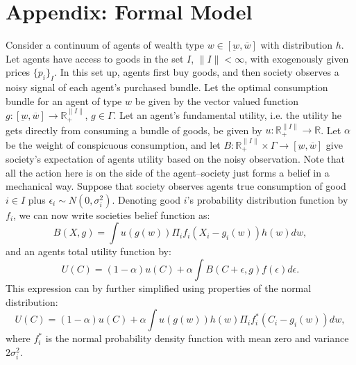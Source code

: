 \documentclass[a4paper,10pt]{article}
\begin{document}
\section*{Appendix: Formal Model}
Consider a continuum of agents of wealth type $w\in[\underbar{w},\overline{w}]$ with distribution $h$.  Let agents have access to goods in the set $I$, $\|I\|<\infty$, with exogenously given prices $\{p_i\}_I$.  In this set up, agents first buy goods, and then society observes a noisy signal of each agent's purchased bundle.  Let the optimal consumption bundle for an agent of type $w$ be given by the vector valued function $g:[\underbar{w},\overline{w}]\rightarrow \mathbb{R}_+^{\|I\|}$, $g\in\Gamma$. Let an agent's fundamental utility, i.e. the utility he gets directly from consuming a bundle of goods, be given by $u:\mathbb{R}_+^{\|I\|}\rightarrow \mathbb{R}$.  Let $\alpha$ be the weight of conspicuous consumption, and let $B:\mathbb{R}_+^{\|I\|}\times \Gamma \rightarrow [\underbar{w},\overline{w}]$ give society's expectation of agents utility based on the noisy observation.  Note that all the action here is on the side of the agent--society just forms a belief in a mechanical way.  Suppose that society observes agents true consumption of good $i\in I$ plus $\epsilon_i \sim N(0,\sigma_i^2)$.  Denoting good $i$'s probability distribution function by $f_i$, we can now write societies belief function as:
\begin{equation}
 B(X,g) = \int u(g(w)) \Pi_i f_i(X_i - g_i(w)) h(w) dw, 
\end{equation}
and an agents total utility function by:
\[ 
 U(C) = (1-\alpha) u(C) + \alpha \int B(C+\epsilon,g) f(\epsilon) d\epsilon.
\]
This expression can by further simplified using properties of the normal distribution:
\begin{equation}
 U(C) = (1-\alpha) u(C) + \alpha \int u(g(w)) h(w) \Pi_i f_i^*(C_i-g_i(w)) dw,
\end{equation}
where $f_i^*$ is the normal probability density function with mean zero and variance $2\sigma_i^2$.

\pagebreak



\end{document}
